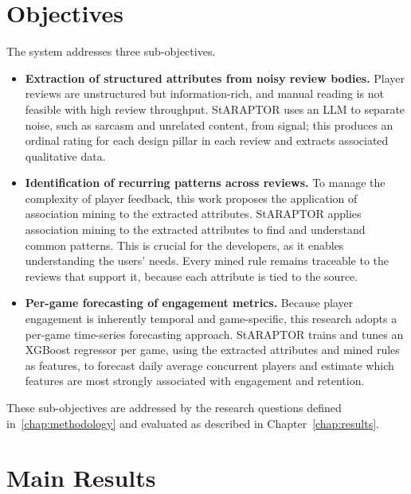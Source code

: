 \section{Objectives}
\label{sec:objectives}

The system addresses three sub-objectives.

\begin{itemize}
    \item \textbf{Extraction of structured attributes from noisy review bodies.} Player reviews are unstructured but information-rich, and manual reading is not feasible with high review throughput. StARAPTOR uses an LLM to separate noise, such as sarcasm and unrelated content, from signal; this produces an ordinal rating for each design pillar in each review and extracts associated qualitative data.
    \item \textbf{Identification of recurring patterns across reviews.} To manage the complexity of player feedback, this work proposes the application of association mining to the extracted attributes.  StARAPTOR applies association mining to the extracted attributes to find and understand common patterns. This is crucial for the developers, as it enables understanding the users' needs. Every mined rule remains traceable to the reviews that support it, because each attribute is tied to the source.
    \item \textbf{Per-game forecasting of engagement metrics.} Because player engagement is inherently temporal and game-specific, this research adopts a per-game time-series forecasting approach. StARAPTOR trains and tunes an XGBoost regressor per game, using the extracted attributes and mined rules as features, to forecast daily average concurrent players and estimate which features are most strongly associated with engagement and retention.
\end{itemize}

These sub-objectives are addressed by the research questions defined in~\ref{chap:methodology} and evaluated as described in Chapter~\ref{chap:results}.

\section{Main Results}
\label{sec:intro_results}

